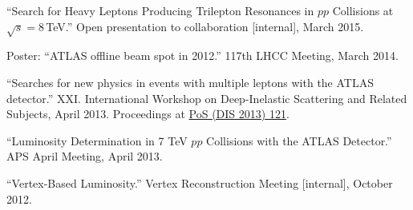 \documentclass[12pt]{article} %
\begin{document}
\smallskip

``Search for Heavy Leptons Producing Trilepton Resonances in $pp$ Collisions at $\sqrt{s}=8$\,TeV.'' Open presentation to collaboration [internal], March 2015.

\smallskip

Poster: ``ATLAS offline beam spot in 2012.'' 117th LHCC Meeting, March 2014.

\smallskip

``Searches for new physics in events with multiple leptons with the ATLAS detector.'' XXI. International Workshop on Deep-Inelastic Scattering and Related Subjects, April 2013. Proceedings at \href{https://doi.org/10.22323/1.191.0121}{PoS (DIS 2013) 121}.

\smallskip

``Luminosity Determination in 7 TeV $pp$ Collisions with the ATLAS Detector.'' APS April Meeting, April 2013.

\smallskip

``Vertex-Based Luminosity.'' Vertex Reconstruction Meeting [internal], October 2012.



%
%
%
%
%
%
%
%
%
%
%
%
\end{document}
